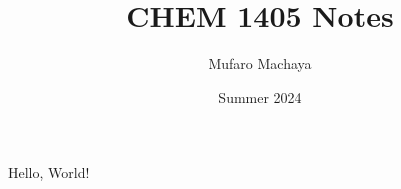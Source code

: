 \documentclass[12pt]{article}
\title{CHEM 1405 Notes}
\author{Mufaro Machaya}
\date{Summer 2024}
\begin{document}
\maketitle

\begin{thrm}[Example]
	Hello, World!
\end{thrm}
\end{document}
